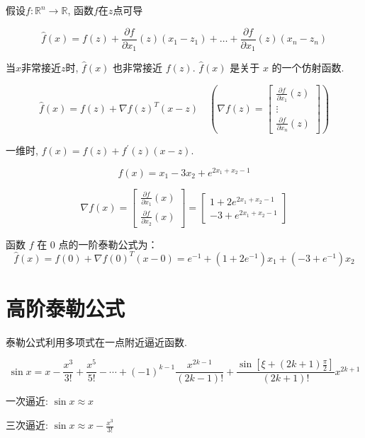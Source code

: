 \begin{definition}[一阶泰勒公式]
    假设$ f: \mathbb{R}^{n} \rightarrow \mathbb{R} $, 函数$f$在$z$点可导

    $$ \hat{f}(x)=f(z)+\frac{\partial f}{\partial x_{1}}(z)\left(x_{1}-z_{1}\right)+\ldots+\frac{\partial f}{\partial x_{1}}(z)\left(x_{n}-z_{n}\right) $$
\end{definition}

当$x$非常接近$z$时, $ \hat{f}(x) $ 也非常接近 $ f(z) $.  
$ \hat{f}(x) $ 是关于 $ x $ 的一个仿射函数. 

\begin{corollary}[一阶泰勒公式的内积形式]
    $$ \hat{f}(x)=f(z)+\nabla f(z)^{T}(x-z) \quad (\nabla f(z)=\left[\begin{array}{c}\frac{\partial f}{\partial x_{1}}(z) \\ \vdots \\ \frac{\partial f}{\partial x_{n}}(z)\end{array}\right]) $$
\end{corollary} 

一维时, $ \hat{f}(x)=f(z)+f^{\prime}(z)(x-z) $.

\begin{example}
    $$ f(x)=x_{1}-3 x_{2}+e^{2 x_{1}+x_{2}-1} $$

    $$ \nabla f(x)=\left[\begin{array}{l}\frac{\partial f}{\partial x_{1}}(x) \\ \frac{\partial f}{\partial x_{2}}(x)\end{array}\right]=\left[\begin{array}{l}1+2 e^{2 x_{1}+x_{2}-1} \\ -3+e^{2 x_{1}+x_{2}-1}\end{array}\right] $$

    函数 $ f $ 在 0 点的一阶泰勒公式为：
    $$ \hat{f}(x)=f(0)+\nabla f(0)^{T}(x-0)=e^{-1}+\left(1+2 e^{-1}\right) x_{1}+\left(-3+e^{-1}\right) x_{2} $$
\end{example}

\section{高阶泰勒公式}

    泰勒公式利用多项式在一点附近逼近函数.
    
\begin{example}
    $$ \sin x= x-\frac{x^{3}}{3 !}+\frac{x^{5}}{5 !}-\cdots+(-1)^{k-1} \frac{x^{2 k-1}}{(2 k-1) !}+\frac{\sin \left[\xi+(2 k+1) \frac{\pi}{2}\right]}{(2 k+1) !} x^{2 k+1} $$

    一次逼近: $  \sin x \approx x $

    三次逼近: $  \sin x \approx x-\frac{x^{3}}{3 !} $
\end{example}


